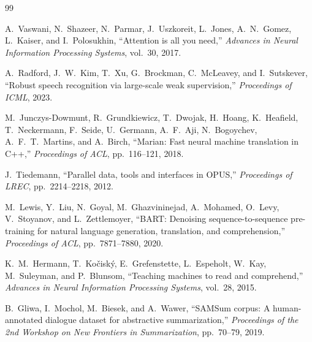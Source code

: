 \documentclass[12pt,a4paper]{report}
\begin{document}
\begin{thebibliography}{99}

A.~Vaswani, N.~Shazeer, N.~Parmar, J.~Uszkoreit, L.~Jones, A.~N.~Gomez,
L.~Kaiser, and I.~Polosukhin,
``Attention is all you need,''
\textit{Advances in Neural Information Processing Systems}, vol.~30, 2017.

A.~Radford, J.~W.~Kim, T.~Xu, G.~Brockman, C.~McLeavey, and I.~Sutskever,
``Robust speech recognition via large-scale weak supervision,''
\textit{Proceedings of ICML}, 2023.

M.~Junczys-Dowmunt, R.~Grundkiewicz, T.~Dwojak, H.~Hoang, K.~Heafield,
T.~Neckermann, F.~Seide, U.~Germann, A.~F.~Aji, N.~Bogoychev,
A.~F.~T.~Martins, and A.~Birch,
``Marian: Fast neural machine translation in C++,''
\textit{Proceedings of ACL}, pp.~116--121, 2018.

J.~Tiedemann,
``Parallel data, tools and interfaces in OPUS,''
\textit{Proceedings of LREC}, pp.~2214--2218, 2012.

M.~Lewis, Y.~Liu, N.~Goyal, M.~Ghazvininejad, A.~Mohamed, O.~Levy,
V.~Stoyanov, and L.~Zettlemoyer,
``BART: Denoising sequence-to-sequence pre-training for natural language
generation, translation, and comprehension,''
\textit{Proceedings of ACL}, pp.~7871--7880, 2020.

K.~M.~Hermann, T.~Ko{\v{c}}isk{\'y}, E.~Grefenstette, L.~Espeholt,
W.~Kay, M.~Suleyman, and P.~Blunsom,
``Teaching machines to read and comprehend,''
\textit{Advances in Neural Information Processing Systems}, vol.~28, 2015.

B.~Gliwa, I.~Mochol, M.~Biesek, and A.~Wawer,
``SAMSum corpus: A human-annotated dialogue dataset for abstractive
summarization,''
\textit{Proceedings of the 2nd Workshop on New Frontiers in Summarization},
pp.~70--79, 2019.

\end{thebibliography}
\end{document}
